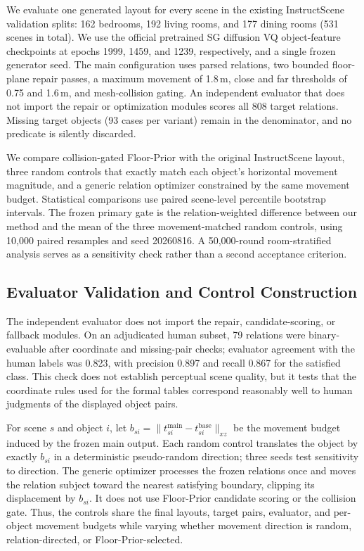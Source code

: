 \documentclass{egpubl}
\newcommand{\fp}{Floor-Prior}
\begin{document}
We evaluate one generated layout for every scene in the existing InstructScene validation splits: 162 bedrooms, 192 living rooms, and 177 dining rooms (531 scenes in total). We use the official pretrained SG diffusion VQ object-feature checkpoints at epochs 1999, 1459, and 1239, respectively, and a single frozen generator seed. The main configuration uses parsed relations, two bounded floor-plane repair passes, a maximum movement of 1.8\,m, close and far thresholds of 0.75 and 1.6\,m, and mesh-collision gating. An independent evaluator that does not import the repair or optimization modules scores all 808 target relations. Missing target objects (93 cases per variant) remain in the denominator, and no predicate is silently discarded.

We compare collision-gated \fp{} with the original InstructScene layout, three random controls that exactly match each object's horizontal movement magnitude, and a generic relation optimizer constrained by the same movement budget. Statistical comparisons use paired scene-level percentile bootstrap intervals. The frozen primary gate is the relation-weighted difference between our method and the mean of the three movement-matched random controls, using 10,000 paired resamples and seed 20260816. A 50,000-round room-stratified analysis serves as a sensitivity check rather than a second acceptance criterion.

\subsection{Evaluator Validation and Control Construction}

The independent evaluator does not import the repair, candidate-scoring, or fallback modules. On an adjudicated human subset, 79 relations were binary-evaluable after coordinate and missing-pair checks; evaluator agreement with the human labels was 0.823, with precision 0.897 and recall 0.867 for the satisfied class. This check does not establish perceptual scene quality, but it tests that the coordinate rules used for the formal tables correspond reasonably well to human judgments of the displayed object pairs.

For scene $s$ and object $i$, let $b_{si}=\lVert t^{\mathrm{main}}_{si}-t^{\mathrm{base}}_{si}\rVert_{xz}$ be the movement budget induced by the frozen main output. Each random control translates the object by exactly $b_{si}$ in a deterministic pseudo-random direction; three seeds test sensitivity to direction. The generic optimizer processes the frozen relations once and moves the relation subject toward the nearest satisfying boundary, clipping its displacement by $b_{si}$. It does not use \fp{} candidate scoring or the collision gate. Thus, the controls share the final layouts, target pairs, evaluator, and per-object movement budgets while varying whether movement direction is random, relation-directed, or \fp{}-selected.
\end{document}
